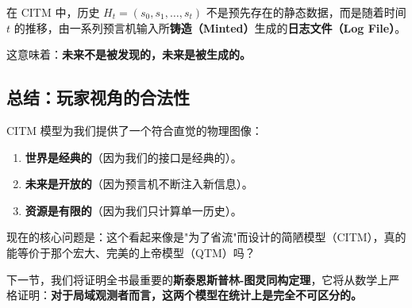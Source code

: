 \begin{definition}[动态历史]
在 CITM 中，历史 $H_t = (s_0, s_1, \dots, s_t)$ 不是预先存在的静态数据，而是随着时间 $t$ 的推移，由一系列预言机输入所\textbf{铸造（Minted）}生成的\textbf{日志文件（Log File）}。
\end{definition}

这意味着：\textbf{未来不是被发现的，未来是被生成的。}

\subsection{总结：玩家视角的合法性}

CITM 模型为我们提供了一个符合直觉的物理图像：

\begin{enumerate}
\item \textbf{世界是经典的}（因为我们的接口是经典的）。

\item \textbf{未来是开放的}（因为预言机不断注入新信息）。

\item \textbf{资源是有限的}（因为我们只计算单一历史）。
\end{enumerate}

现在的核心问题是：这个看起来像是"为了省流"而设计的简陋模型（CITM），真的能等价于那个宏大、完美的上帝模型（QTM）吗？

下一节，我们将证明全书最重要的\textbf{斯泰恩斯普林-图灵同构定理}，它将从数学上严格证明：\textbf{对于局域观测者而言，这两个模型在统计上是完全不可区分的。}
